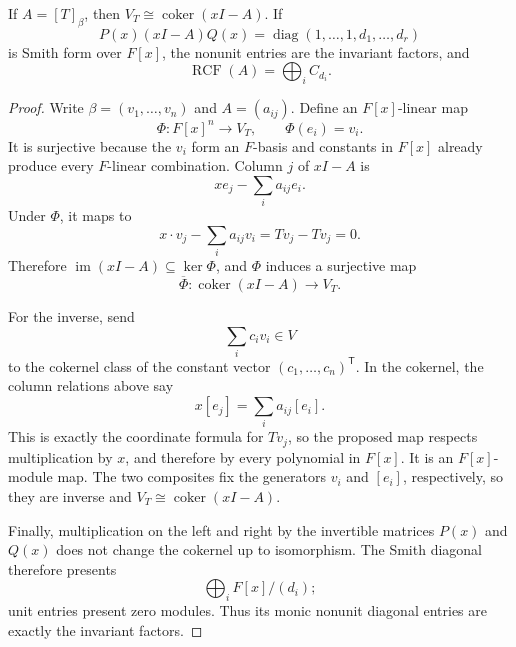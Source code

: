 \begin{theorem}
\label{thm:operator-cokernel-presentation}
If \(A=[T]_\beta\), then \(V_T\cong\operatorname{coker}(xI-A)\). If
\[
P(x)(xI-A)Q(x)=\operatorname{diag}(1,\ldots,1,d_1,\ldots,d_r)
\]
is Smith form over \(F[x]\), the nonunit entries are the invariant factors,
and
\[
\operatorname{RCF}(A)=\bigoplus_iC_{d_i}.
\]
\end{theorem}
\begin{proof}
Write \(\beta=(v_1,\ldots,v_n)\) and \(A=(a_{ij})\). Define an
\(F[x]\)-linear map
\[
\Phi:F[x]^n\longrightarrow V_T,\qquad \Phi(e_i)=v_i.
\]
It is surjective because the \(v_i\) form an \(F\)-basis and constants in
\(F[x]\) already produce every \(F\)-linear combination. Column \(j\) of
\(xI-A\) is
\[
xe_j-\sum_i a_{ij}e_i.
\]
Under \(\Phi\), it maps to
\[
x\cdot v_j-\sum_i a_{ij}v_i
=Tv_j-Tv_j=0.
\]
Therefore \(\operatorname{im}(xI-A)\subseteq\ker\Phi\), and \(\Phi\)
induces a surjective map
\[
\overline\Phi:\operatorname{coker}(xI-A)\longrightarrow V_T.
\]

For the inverse, send
\[
\sum_i c_iv_i\in V
\]
to the cokernel class of the constant vector
\((c_1,\ldots,c_n)^{\mathsf T}\). In the cokernel, the
column relations above say
\[
x[e_j]=\sum_i a_{ij}[e_i].
\]
This is exactly the coordinate formula for \(Tv_j\), so the proposed map
respects multiplication by \(x\), and therefore by every polynomial in
\(F[x]\). It is an \(F[x]\)-module map. The two composites fix the
generators \(v_i\) and \([e_i]\), respectively, so they are inverse and
\(V_T\cong\operatorname{coker}(xI-A)\).

Finally, multiplication on the left and right by the invertible matrices
\(P(x)\) and \(Q(x)\) does not change the cokernel up to isomorphism. The
Smith diagonal therefore presents
\[
\bigoplus_iF[x]/(d_i);
\]
unit entries present zero modules. Thus its monic nonunit diagonal entries
are exactly the invariant factors.
\end{proof}


